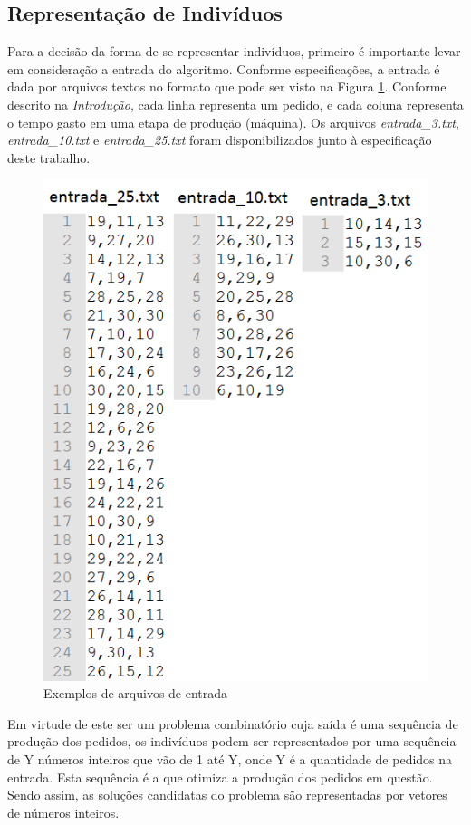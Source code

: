 \documentclass[12pt]{elsarticle}
\begin{document}
	\subsection{Representação de Indivíduos}
	Para a decisão da forma de se representar indivíduos, primeiro é importante levar em consideração a entrada do algoritmo. Conforme especificações, a entrada é dada por arquivos textos no formato que pode ser visto na Figura \ref{fig:entrada}. Conforme descrito na \textit{Introdução}, cada linha representa um pedido, e cada coluna representa o tempo gasto em uma etapa de produção (máquina). Os arquivos \textit{entrada\_3.txt}, \textit{entrada\_10.txt} e \textit{entrada\_25.txt} foram disponibilizados junto à especificação deste trabalho.
	\begin{figure}[h]
		\centering
		\includegraphics[width=12cm]{img/entrada.png}
		\caption{Exemplos de arquivos de entrada}
		\label{fig:entrada}
	\end{figure}
	
	Em virtude de este ser um problema combinatório cuja saída é uma sequência de produção dos pedidos, os indivíduos podem ser representados por uma sequência de Y números inteiros que vão de 1 até Y, onde Y é a quantidade de pedidos na entrada. Esta sequência é a que otimiza a produção dos pedidos em questão. Sendo assim, as soluções candidatas do problema são representadas por vetores de números inteiros.
	
\end{document}

